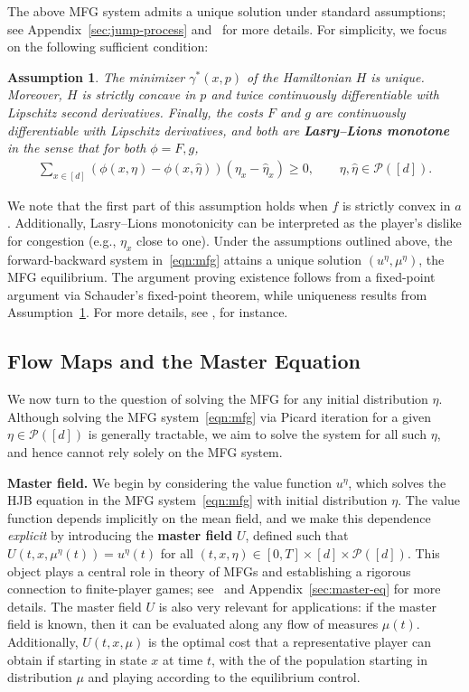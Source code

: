 \documentclass[11pt,reqno]{amsart}
\numberwithin{equation}{section}
\theoremstyle{plain}
\newtheorem{assumption}{Assumption}[section]
\newcommand{\calP}{{\mathcal P}}
\newcommand{\1}{\boldsymbol{\mathbbm{1}}}
\begin{document}
The above MFG system admits a unique solution under standard assumptions; see Appendix~\ref{sec:jump-process} and~\cite{bay-coh2019, cec-pel2019} for more details. 
For simplicity, we focus on the following sufficient condition:
\begin{assumption}
\label{asmp:mfg-uniqueness}
    The minimizer $\gamma^*(x, p)$ of the Hamiltonian $H$ is unique. Moreover, $H$ is strictly concave in $p$ and twice continuously differentiable with Lipschitz second derivatives. Finally, the costs $F$ and $g$ are continuously differentiable with Lipschitz derivatives, and both are \textbf{Lasry--Lions monotone} in the sense that for both $\phi = F, g$,
    \begin{align}\label{eqn:LL-monotone}
    \textstyle
        \sum_{x \in [d]} (\phi(x, \eta) - \phi(x, \hat{\eta})) (\eta_x - \hat{\eta}_x) \geq 0, \qquad \eta, \hat{\eta} \in \mathcal{P}([d]).
    \end{align} 
\end{assumption}
We note that the first part of this assumption holds when $f$ is strictly convex in $a$. Additionally, Lasry--Lions monotonicity can be interpreted as the player's dislike for congestion (e.g., $\eta_x$ close to one). Under the assumptions outlined above, the forward-backward system in~\eqref{eqn:mfg} attains a unique solution $(u^\eta, \mu^\eta)$, the MFG equilibrium. The argument proving existence follows from a fixed-point argument via Schauder's fixed-point theorem, while uniqueness results from Assumption~\ref{asmp:mfg-uniqueness}. For more details, see \cite[Section 7.2.2]{CarmonaDelarue_book_I}, for instance. 

\subsection{Flow Maps and the Master Equation}
\label{subsec:flow-maps}

We now turn to the question of solving the MFG for any initial distribution $\eta$. Although solving the MFG system~\eqref{eqn:mfg} via Picard iteration for a given $\eta \in \calP([d])$ is generally tractable, we aim to solve the system for all such $\eta$, and hence cannot rely solely on the MFG system.

\noindent\textbf{Master field.} We begin by considering the value function $u^\eta$, which solves the HJB equation in the MFG system~\eqref{eqn:mfg} with initial distribution $\eta$. The value function depends implicitly on the mean field, and we make this dependence \emph{explicit} by introducing the \textbf{master field} $U$, defined such that $U(t, x, \mu^{\eta}(t)) = u^{\eta}(t)$ for all $(t, x, \eta) \in [0, T] \times [d] \times \calP([d])$.
This object plays a central role in theory of MFGs and establishing a rigorous connection to finite-player games; see~\cite{bay-coh2019, cec-pel2019} and Appendix~\ref{sec:master-eq} for more details. The master field $U$ is also very relevant for applications: if the master field is known, then it can be evaluated along any flow of measures $\mu(t)$. Additionally, $U(t,x,\mu)$ is the optimal cost that a representative player can obtain if starting in state $x$ at time $t$, with the of the population starting in distribution $\mu$ and playing according to the equilibrium control. 
\end{document}
